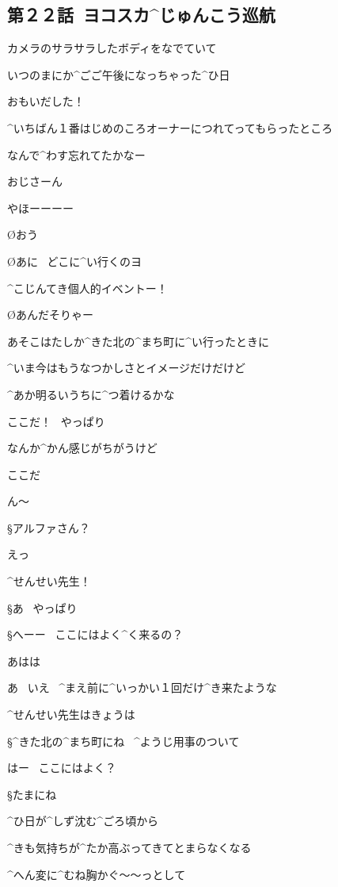 \subsection{第２２話\ ヨコスカ^{じゅんこう}{巡航}}

\page[102]
\A カメラのサラサラしたボディをなでていて

\A いつのまにか^{ごご}{午後}になっちゃった^{ひ}{日}

\page[104]
\A おもいだした！

\A ^{いちばん}{１番}はじめのころオーナーにつれてってもらったところ

\A なんで^{わす}{忘}れてたかなー

\A おじさーん

\page
\A やほーーーー

\O おう

\O あに
\ どこに^{い}{行}くのヨ

\A ^{こじんてき}{個人的}イベントー！

\O あんだそりゃー

\page
\A あそこはたしか^{きた}{北}の^{まち}{町}に^{い}{行}ったときに

\A ^{いま}{今}はもうなつかしさとイメージだけだけど

\A ^{あか}{明}るいうちに^{つ}{着}けるかな

\page
\A ここだ！
\ やっぱり

\A なんか^{かん}{感}じがちがうけど

\A ここだ

\A ん〜

\S アルファさん？

\A えっ

\page
\A ^{せんせい}{先生}！

\S あ
\ やっぱり

\S へーー
\ ここにはよく^{く}{来}るの？

\A あはは

\A あ
\ いえ
\ ^{まえ}{前}に^{いっかい}{１回}だけ^{き}{来}たような

\A ^{せんせい}{先生}はきょうは

\S ^{きた}{北}の^{まち}{町}にね
\ ^{ようじ}{用事}のついて

\A はー
\ ここにはよく？

\S たまにね

\page
\A ^{ひ}{日}が^{しず}{沈}む^{ごろ}{頃}から

\A ^{きも}{気持}ちが^{たか}{高}ぶってきてとまらなくなる

\A ^{へん}{変}に^{むね}{胸}かぐ〜〜っとして

